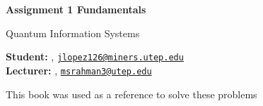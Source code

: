 


\usepackage{physics}
\usepackage{quantikz} %
\usepackage{tikz}
\usetikzlibrary{quantikz2}
\usepackage{amsmath}
\usepackage{amssymb}
\usetikzlibrary{arrows.meta}


\begin{Large}
    \textsf{\textbf{Assignment 1 Fundamentals}}
    
    Quantum Information Systems
\end{Large}

\vspace{1ex}

\textsf{\textbf{Student:}} , \href{mailto:jlopez126@miners.utep.edu}{\texttt{jlopez126@miners.utep.edu}}\\
\textsf{\textbf{Lecturer:}} , \href{mailto:msrahman3@utep.edu}{\texttt{msrahman3@utep.edu}}


\vspace{2ex}

This book was used as a reference to solve these problems \cite{Wong2022}


